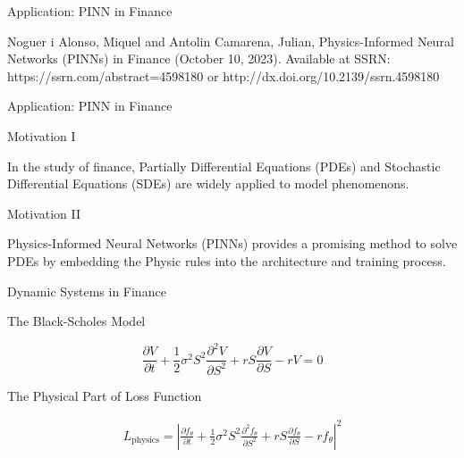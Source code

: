 \begin{frame}{Application: PINN in Finance}

    Noguer i Alonso, Miquel and Antolin Camarena, Julian, Physics-Informed Neural Networks (PINNs) in Finance (October 10, 2023). Available at SSRN: https://ssrn.com/abstract=4598180 or http://dx.doi.org/10.2139/ssrn.4598180 
\end{frame}

\begin{frame}{Application: PINN in Finance}
 
    \begin{block}{Motivation I}
    
        In the study of finance, Partially Differential Equations (PDEs) and Stochastic Differential Equations (SDEs) are widely applied to model phenomenons.  

    \end{block}

    \begin{block}{Motivation II}
    
        Physics-Informed Neural Networks (PINNs) provides a promising method to solve PDEs by embedding the Physic rules into the architecture and training process. 

    \end{block}
\end{frame}

\begin{frame}{Dynamic Systems in Finance}
    \begin{block}{The Black-Scholes Model}
    
        \begin{equation}
            \frac{\partial V}{\partial t} + \frac{1}{2} \sigma^2 S^2 \frac{\partial^2 V}{\partial S^2} + r S \frac{\partial V}{\partial S} - r V = 0
        \end{equation}

    \end{block}

    \begin{block}{The Physical Part of Loss Function}
    
        \begin{equation}
            \begin{align}
               L_{\text{physics}} = \left| \frac{\partial f_{\theta}}{\partial t} + \frac{1}{2} \sigma^2 S^2 \frac{\partial^2 f_{\theta}}{\partial S^2} + r S \frac{\partial f_{\theta}}{\partial S} - r f_{\theta} \right|^2
            \end{align}
        \end{equation}
    \end{block}
\end{frame}

